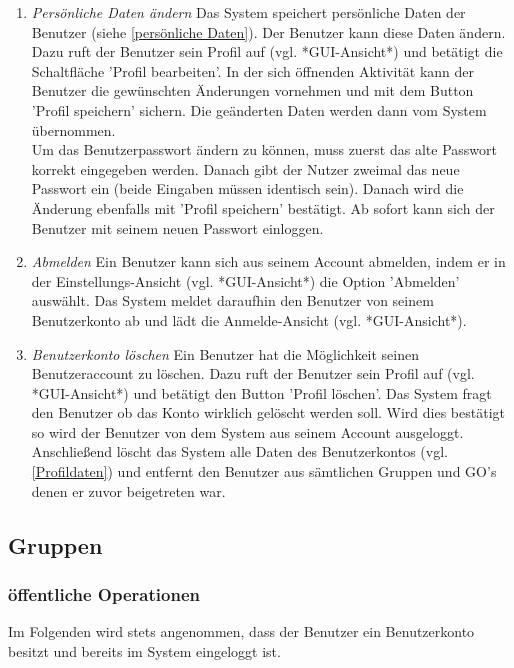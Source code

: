 \documentclass[parskip=full]{scrartcl}
\def\threedigits#1{%
  \ifnum#1<100 0\fi
  \ifnum#1<10 0\fi
  \number#1}
\begin{document}
\begin{enumerate}[label={\textbf{/F\protect\threedigits{\theenumi}0/}}, leftmargin=*]
	
	\item \textit{Persönliche Daten ändern} Das System speichert persönliche Daten der Benutzer (siehe  \ref{persönliche Daten}). Der Benutzer kann diese Daten ändern. Dazu ruft der Benutzer sein Profil auf (vgl. *GUI-Ansicht*) und betätigt die Schaltfläche 'Profil bearbeiten'. In der sich öffnenden Aktivität kann der Benutzer die gewünschten Änderungen vornehmen und mit dem Button 'Profil speichern' sichern. Die geänderten Daten werden dann vom System übernommen.\\
	Um das Benutzerpasswort ändern zu können, muss zuerst das alte Passwort korrekt eingegeben werden. Danach gibt der Nutzer zweimal das neue Passwort ein (beide Eingaben müssen identisch sein). Danach wird die Änderung ebenfalls mit 'Profil speichern' bestätigt. Ab sofort kann sich der Benutzer mit seinem neuen Passwort einloggen.
	
	\item \textit{Abmelden} Ein Benutzer kann sich aus seinem Account abmelden, indem er in der Einstellungs-Ansicht (vgl. *GUI-Ansicht*) die Option 'Abmelden' auswählt. Das System meldet daraufhin den Benutzer von seinem Benutzerkonto ab und lädt die Anmelde-Ansicht (vgl. *GUI-Ansicht*).
	
	\item \textit{Benutzerkonto löschen}
	Ein Benutzer hat die Möglichkeit seinen Benutzeraccount zu löschen. Dazu ruft der Benutzer sein Profil auf (vgl. *GUI-Ansicht*) und betätigt den Button 'Profil löschen'. Das System fragt den Benutzer ob das Konto wirklich gelöscht werden soll. Wird dies bestätigt so wird der Benutzer von dem System aus seinem Account ausgeloggt. Anschließend löscht das System alle Daten des Benutzerkontos (vgl. \ref{Profildaten}) und entfernt den Benutzer aus sämtlichen Gruppen und GO's denen er zuvor beigetreten war.
\end{enumerate}

\subsection{Gruppen}

\subsubsection{öffentliche Operationen} %
Im Folgenden wird stets angenommen, dass der Benutzer ein Benutzerkonto besitzt und bereits im System eingeloggt ist.
\end{document}
